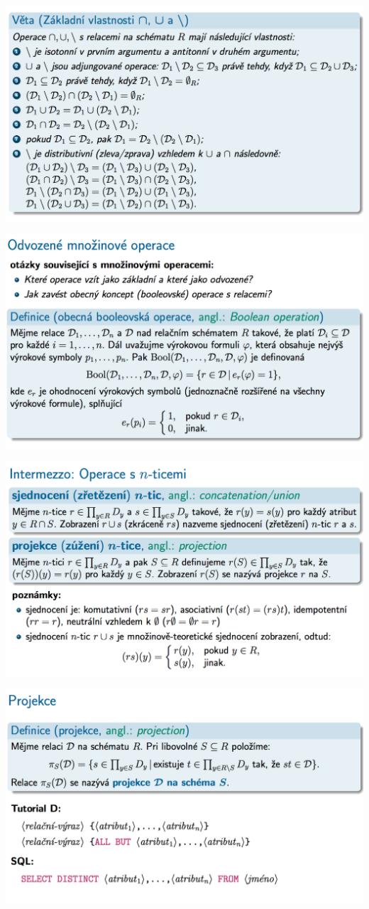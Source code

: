\documentclass[10pt,a4paper]{article}
\begin{document}
	\includegraphics[scale=0.4]{img/25}
	
	\includegraphics[scale=0.4]{img/26}
	
	\includegraphics[scale=0.4]{img/27}
	
	\includegraphics[scale=0.4]{img/29}
	
\end{document}
